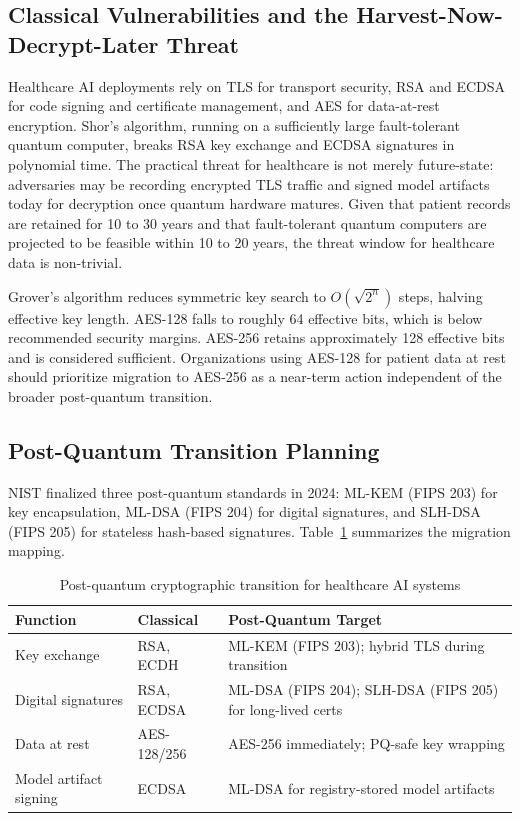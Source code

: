 \documentclass[conference]{IEEEtran}
\begin{document}
	\subsection{Classical Vulnerabilities and the Harvest-Now-Decrypt-Later Threat}
	Healthcare AI deployments rely on TLS for transport security, RSA and ECDSA for code signing and certificate management, and AES for data-at-rest encryption. Shor's algorithm, running on a sufficiently large fault-tolerant quantum computer, breaks RSA key exchange and ECDSA signatures in polynomial time. The practical threat for healthcare is not merely future-state: adversaries may be recording encrypted TLS traffic and signed model artifacts today for decryption once quantum hardware matures. Given that patient records are retained for 10 to 30 years and that fault-tolerant quantum computers are projected to be feasible within 10 to 20 years, the threat window for healthcare data is non-trivial.

	Grover's algorithm reduces symmetric key search to $O(\sqrt{2^n})$ steps, halving effective key length. AES-128 falls to roughly 64 effective bits, which is below recommended security margins. AES-256 retains approximately 128 effective bits and is considered sufficient. Organizations using AES-128 for patient data at rest should prioritize migration to AES-256 as a near-term action independent of the broader post-quantum transition.

	\subsection{Post-Quantum Transition Planning}
	NIST finalized three post-quantum standards in 2024: ML-KEM (FIPS 203) \cite{fips203} for key encapsulation, ML-DSA (FIPS 204) \cite{fips204} for digital signatures, and SLH-DSA (FIPS 205) \cite{fips205} for stateless hash-based signatures. Table~\ref{tab:pqc} summarizes the migration mapping.

	\begin{table}[H]
		\centering
		\caption{Post-quantum cryptographic transition for healthcare AI systems}
		\label{tab:pqc}
		\footnotesize
		\begin{tabularx}{\linewidth}{>{\raggedright\arraybackslash}p{2.0cm} >{\raggedright\arraybackslash}X >{\raggedright\arraybackslash}X}
			\toprule
			Function & Classical & Post-Quantum Target \\
			\midrule
			Key exchange & RSA, ECDH & ML-KEM (FIPS 203); hybrid TLS during transition \\
			Digital signatures & RSA, ECDSA & ML-DSA (FIPS 204); SLH-DSA (FIPS 205) for long-lived certs \\
			Data at rest & AES-128/256 & AES-256 immediately; PQ-safe key wrapping \\
			Model artifact signing & ECDSA & ML-DSA for registry-stored model artifacts \\
			\bottomrule
		\end{tabularx}
	\end{table}
\end{document}
